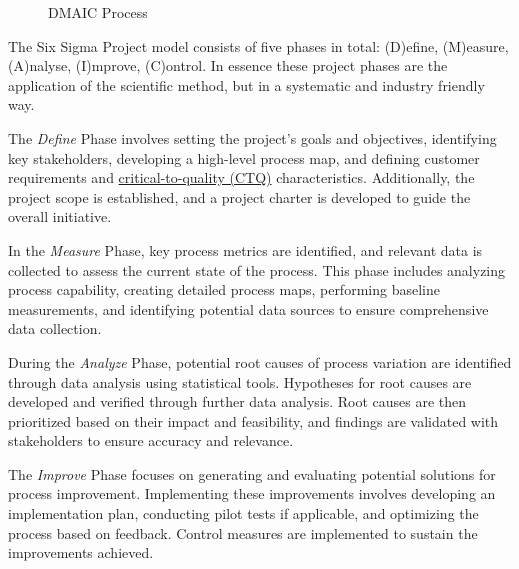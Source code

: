 \documentclass[
  a4paper,
]{scrbook}
\begin{document}
\begin{figure}[ht]


\caption{\label{fig-dmaic}DMAIC Process}

\end{figure}%

The Six Sigma Project model consists of five phases in total: (D)efine,
(M)easure, (A)nalyse, (I)mprove, (C)ontrol. In essence these project
phases are the application of the scientific method, but in a systematic
and industry friendly way.

The \emph{Define} Phase involves setting the project's goals and
objectives, identifying key stakeholders, developing a high-level
process map, and defining customer requirements and
\hyperref[CTQ]{critical-to-quality (CTQ)} characteristics. Additionally,
the project scope is established, and a project charter is developed to
guide the overall initiative.

In the \emph{Measure} Phase, key process metrics are identified, and
relevant data is collected to assess the current state of the process.
This phase includes analyzing process capability, creating detailed
process maps, performing baseline measurements, and identifying
potential data sources to ensure comprehensive data collection.

During the \emph{Analyze} Phase, potential root causes of process
variation are identified through data analysis using statistical tools.
Hypotheses for root causes are developed and verified through further
data analysis. Root causes are then prioritized based on their impact
and feasibility, and findings are validated with stakeholders to ensure
accuracy and relevance.

The \emph{Improve} Phase focuses on generating and evaluating potential
solutions for process improvement. Implementing these improvements
involves developing an implementation plan, conducting pilot tests if
applicable, and optimizing the process based on feedback. Control
measures are implemented to sustain the improvements achieved.
\end{document}
